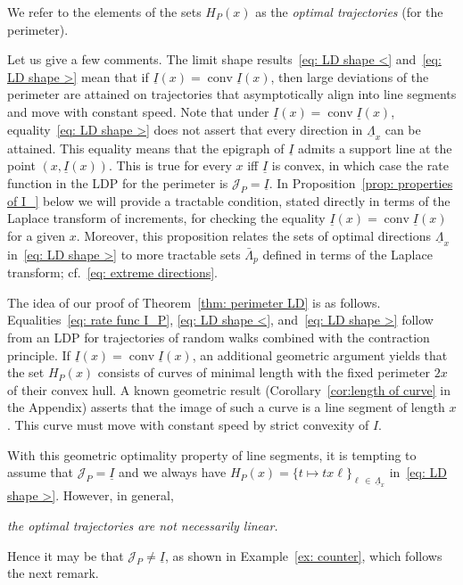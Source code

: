 \documentclass[10pt]{amsart}
\theoremstyle{definition}\newtheorem{defi}[theo]{Definition}\newtheorem{rema}[theo]{Remark}\newtheorem{exam}[theo]{Example}\newtheorem{exem}[theo]{Example}\newtheorem{nota}[theo]{Notation}
\DeclareMathOperator{\conv}{conv}
\newcommand{\ubar}[1]{\underline{#1}}
\newcommand{\Jcl}{\mathcal{J}}
\begin{document}
We refer to the elements of the sets $H_P(x)$ as the \emph{optimal trajectories} (for the perimeter).

Let us give a few comments. The limit shape results~\eqref{eq: LD shape <} and~\eqref{eq: LD shape >} mean that if $\ubar I(x) = \conv \ubar I(x)$, then large deviations of the perimeter are attained on trajectories that asymptotically align into line segments and move with constant speed. Note that under $\ubar I(x) = \conv \ubar I(x)$, equality~\eqref{eq: LD shape >} does not assert that every direction in $\ubar{\Lambda}_x$ can be attained. This equality means that the epigraph of $\ubar I$ admits a support line at the point $(x, \ubar I(x))$. This is true for every $x$ iff $\ubar I$ is convex, in which case the rate function in the LDP for the perimeter is $\Jcl_P = \ubar I$. In Proposition~\ref{prop: properties of I_} below we will provide a tractable condition, stated directly in terms of the Laplace transform of increments, for checking the equality $\ubar I(x)= \conv \ubar I(x)$ for a given $x$. Moreover, this proposition relates the sets of optimal directions $\ubar{\Lambda}_x$ in~\eqref{eq: LD shape >} to more tractable sets $\bar \Lambda_p$ defined in terms of the Laplace transform; cf.~\eqref{eq: extreme directions}.

The idea of our proof of Theorem~\ref{thm: perimeter LD} is as follows. Equalities~\eqref{eq: rate func I_P}, \eqref{eq: LD shape <}, and~\eqref{eq: LD shape >} follow from an LDP for trajectories of random walks combined with the contraction principle. If $\ubar I(x) = \conv \ubar I(x)$, an additional geometric argument yields that the set $H_P(x)$ consists of curves of minimal length with the fixed perimeter $2x$ of their convex hull. A known geometric result (Corollary~\ref{cor:length of curve} in the Appendix) asserts that the image of such a curve is a line segment of length $x$. This curve must move with constant speed by strict convexity of $I$.

With this geometric optimality property of line segments, it is tempting to assume that $\Jcl_P = \ubar I$ and we always have $H_P(x)=\{t \mapsto t x \ell\}_{\ell\,\in\, \ubar\Lambda_x}$ in~\eqref{eq: LD shape >}. However, in general,
\begin{center}
\emph{the optimal trajectories are not necessarily linear.}
\end{center}
Hence it may be that $\Jcl_P \neq \ubar I$, as shown in Example~\ref{ex: counter}, which follows the next remark.
\end{document}
